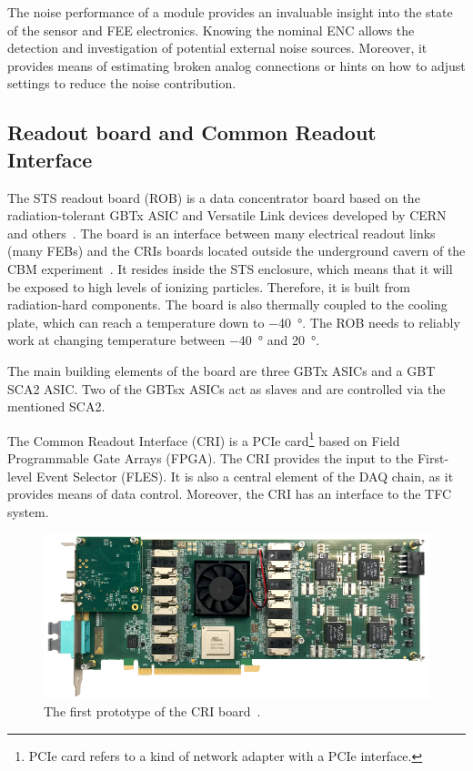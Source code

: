 The noise performance of a module provides an invaluable insight into the state of the sensor and \gls{FEE} electronics. Knowing the nominal \gls{ENC} allows the detection and investigation of potential external noise sources. Moreover, it provides means of estimating broken analog connections or hints on how to adjust settings to reduce the noise contribution.
\subsection{Readout board and Common Readout Interface}

The \gls{STS} readout board (\gls{ROB}) is a data concentrator board based on the radiation-tolerant GBTx ASIC and Versatile Link
devices developed by CERN and others~\cite{Bonacini:1235849, C_2013}. The board is an interface between many electrical readout links (many \glspl{FEB}) and the \glspl{CRI} boards located outside the underground cavern of the \gls{CBM} experiment~\cite{Lehnert_2017}. It resides inside the \gls{STS} enclosure, which means that it will be exposed to high levels of ionizing particles. Therefore, it is built from radiation-hard components. The board is also thermally coupled to the cooling plate, which can reach a temperature down to \SI{-40}{\degree}. The \gls{ROB} needs to reliably work at changing temperature between \SI{-40}{\degree} and \SI{20}{\degree}. 

The main building elements of the board are three \gls{GBT}x \glspl{ASIC} and a \gls{GBT} \gls{SCA2} \gls{ASIC}. Two of the \glspl{GBT}x \glspl{ASIC} act as slaves and are controlled via the mentioned \gls{SCA2}. 

The Common Readout Interface (\gls{CRI}) is a PCIe card\footnote{PCIe card refers to a kind of network adapter with a PCIe interface.} based on Field Programmable Gate Arrays (\gls{FPGA}). The \gls{CRI} provides the input to the First-level Event Selector (\gls{FLES}). It is also a central element of the \gls{DAQ} chain, as it provides means of data control. Moreover, the \gls{CRI} has an interface to the \gls{TFC} system. 
\begin{figure}[!h]
\centering
\includegraphics[width=0.8\columnwidth]{Chapter2/images/cri_board_atlas.pdf}
\caption{The first prototype of the \gls{CRI} board~\cite{CRI}.}
\label{fig_cri_board}
\end{figure}


